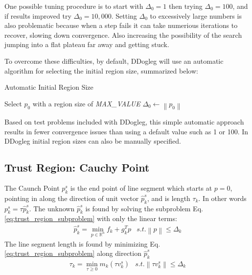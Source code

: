 \documentclass[peerreview,onecolumn]{IEEEtran}
\newcommand{\R}{\mathbb{R}}
\newcommand{\norm}[1]{\left\lVert#1\right\rVert}
\begin{document}
One possible tuning procedure is to start with $\Delta_0=1$ then trying $\Delta_0=100$, and if results improved try $\Delta_0=10,000$. Setting $\Delta_0$ to excessively large numbers is also problematic because when a step fails it can take numerious iterations to recover, slowing down convergence. Also increasing the possibility of the search jumping into a flat plateau far away and getting stuck. 

To overcome these difficulties, by default, DDogleg will use an automatic algorithm for selecting the initial region size, summarized below:
\begin{algorithm}{}
\caption{\label{alg:initial_region}Automatic Initial Region Size}
\begin{algorithmic}[1]
	\State Select $p_0$ with a region size of \textit{MAX\_VALUE}
	\State $\Delta_0 \gets \norm{p_0}$ 
\end{algorithmic}
\end{algorithm}
Based on test problems included with DDogleg, this simple automatic approach results in fewer convergence issues than using a default value such as 1 or 100. In DDogleg initial region sizes can also be manually specified.

\subsection{Trust Region: Cauchy Point}
\label{section:cauchy} 

The Caunch Point $p^s_k$ is the end point of line segment which starts at $p=0$, pointing in along the direction of unit vector $\hat{p}^s_k$, and is length $\tau_k$. In other words $p^s_k = \tau \hat{p}^s_k$. The unknown $\hat{p}^s_k$ is found by solving the subproblem Eq. \ref{eq:trust_region_subproblem} with only the linear terms:
\begin{equation}
\begin{array}{lr}
\hat{p}^s_k = \min\limits_{p\in \R^n} f_k + g_k^T p & s.t. \norm{p} \le \Delta_k
\end{array}
\end{equation}
The line segment length is found by minimizing Eq. \ref{eq:trust_region_subproblem} along direction $\hat{p}^s_k$
\begin{equation}
\begin{array}{lr}
\tau_k = \min\limits_{\tau \ge 0} m_k(\tau v^s_k) & s.t. \norm{\tau v^s_k} \le \Delta_k
\end{array}
\end{equation}
\end{document}
